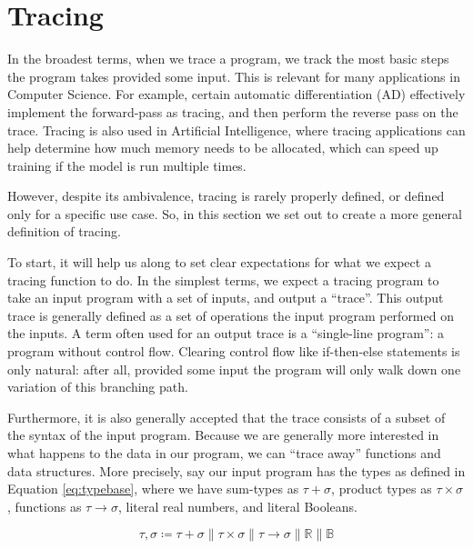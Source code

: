 \section{Tracing}
    In the broadest terms, when we trace a program, we track the most basic steps the program takes provided some input.
    This is relevant for many applications in Computer Science.
    For example, certain automatic differentiation (AD) effectively implement the forward-pass as tracing, and then perform the reverse pass on the trace\cn.
    Tracing is also used in Artificial Intelligence, where tracing applications can help determine how much memory needs to be allocated, which can speed up training if the model is run multiple times\cn.

    However, despite its ambivalence, tracing is rarely properly defined, or defined only for a specific use case.
    So, in this section we set out to create a more general definition of tracing.
    
    To start, it will help us along to set clear expectations for what we expect a tracing function to do.
    In the simplest terms, we expect a tracing program to take an input program with a set of inputs, and output a ``trace''.
    This output trace is generally defined as a set of operations the input program performed on the inputs.
    A term often used for an output trace is a ``single-line program''\cn: a program without control flow.
    Clearing control flow like if-then-else statements is only natural: after all, provided some input the program will only walk down one variation of this branching path.

    Furthermore, it is also generally accepted that the trace consists of a subset of the syntax of the input program.
    Because we are generally more interested in what happens to the data in our program, we can ``trace away'' functions and data structures.
    More precisely, say our input program has the types as defined in Equation \ref{eq:typebase}, where we have sum-types as $\tau+\sigma$, product types as $\tau\times\sigma$, functions as $\tau\to\sigma$, literal real numbers, and literal Booleans.

    \begin{equation}
        \label{eq:typebase}
        \tau,\sigma\coloneqq\tau+\sigma\|\tau\times\sigma\|\tau\to\sigma\|\mathbb{R}\|\mathbb{B}
    \end{equation}

